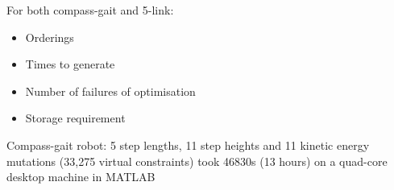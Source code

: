 For both compass-gait and 5-link:
\begin{itemize}
	\item Orderings
	\item Times to generate
	\item Number of failures of optimisation
	\item Storage requirement
\end{itemize}

Compass-gait robot: 5 step lengths, 11 step heights and 11 kinetic energy mutations (33,275 virtual constraints) took 46830s (13 hours) on a quad-core desktop machine in MATLAB